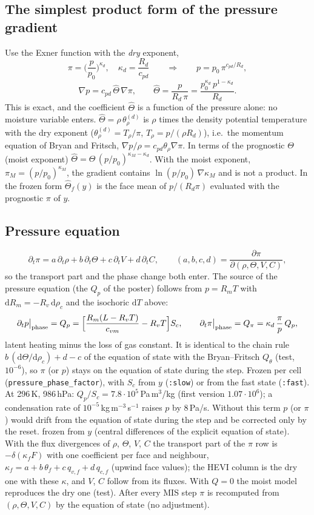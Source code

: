 \documentclass[11pt,a4paper]{article}
\newcommand{\code}[1]{\texttt{#1}}
\begin{document}
\subsection{The simplest product form of the pressure gradient}
Use the Exner function with the \emph{dry} exponent,
\[
\pi=\Big(\frac{p}{p_0}\Big)^{\kappa_d},\quad \kappa_d=\frac{R_d}{c_{pd}}
\qquad\Longrightarrow\qquad
p=p_0\,\pi^{c_{pd}/R_d},
\]
\[
\nabla p=c_{pd}\,\hat\Theta\,\nabla\pi,\qquad \hat\Theta=\frac{p}{R_d\,\pi}=\frac{p_0^{\kappa_d}\,p^{1-\kappa_d}}{R_d}.
\]
This is exact, and the coefficient $\hat\Theta$ is a function of the pressure alone: no moisture
variable enters. $\hat\Theta=\rho\,\theta_\rho^{(d)}$ is $\rho$ times the density potential temperature
with the dry exponent ($\theta_\rho^{(d)}=T_\rho/\pi$, $T_\rho=p/(\rho R_d)$), i.e.\ the momentum equation
of Bryan and Fritsch, $\nabla p/\rho=c_{pd}\theta_\rho\nabla\pi$. In terms of the prognostic $\Theta$
(moist exponent) $\hat\Theta=\Theta\,(p/p_0)^{\kappa_M-\kappa_d}$. With the moist exponent,
$\pi_M=(p/p_0)^{\kappa_M}$, the gradient contains $\ln(p/p_0)\,\nabla\kappa_M$ and is not a product.
In the frozen form $\hat\Theta_f(y)$ is the face mean of $p/(R_d\pi)$ evaluated with the prognostic
$\pi$ of $y$.

\subsection{Pressure equation}
\[
\partial_t\pi=a\,\partial_t\rho+b\,\partial_t\Theta+c\,\partial_tV+d\,\partial_tC,\qquad
(a,b,c,d)=\frac{\partial\pi}{\partial(\rho,\Theta,V,C)},
\]
so the transport part and the phase change both enter. The source of the pressure equation (the $Q_p$
of the poster) follows from $p=R_mT$ with $\mathrm dR_m=-R_v\,\mathrm d\rho_c$ and the isochoric
$\mathrm dT$ above:
\[
\partial_tp\big|_{\rm phase}=Q_p=\Big[\frac{R_m(L-R_vT)}{c_{vm}}-R_vT\Big]S_c,\qquad
\partial_t\pi\big|_{\rm phase}=Q_\pi=\kappa_d\,\frac{\pi}{p}\,Q_p ,
\]
latent heating minus the loss of gas constant. It is identical to the chain rule
$b\,(\mathrm d\Theta/\mathrm d\rho_c)+d-c$ of the equation of state with the Bryan--Fritsch $Q_\theta$
(test, $10^{-6}$), so $\pi$ (or $p$) stays on the equation of state during the step. Frozen per cell
(\code{pressure\_phase\_factor}), with $S_c$ from $y$ (\code{:slow}) or from the fast state (\code{:fast}).
At 296\,K, 986\,hPa: $Q_p/S_c=7.8\cdot10^5$\,Pa\,m$^3$/kg (first version $1.07\cdot10^6$); a condensation
rate of $10^{-5}$\,kg\,m$^{-3}$\,s$^{-1}$ raises $p$ by 8\,Pa/s. Without this term $p$ (or $\pi$) would drift
from the equation of state during the step and be corrected only by the reset.
frozen from $y$ (central differences of the explicit equation of state). With the flux divergences of
$\rho$, $\Theta$, $V$, $C$ the transport part of the $\pi$ row is $-\delta(\kappa_f F)$ with one coefficient
per face and neighbour, $\kappa_f=a+b\,\theta_f+c\,q_{v,f}+d\,q_{c,f}$ (upwind face values); the HEVI column
is the dry one with these $\kappa$, and $V$, $C$ follow from its fluxes. With $Q=0$ the moist
model reproduces the dry one (test). After every MIS step $\pi$ is recomputed from $(\rho,\Theta,V,C)$ by
the equation of state (no adjustment).
\end{document}
